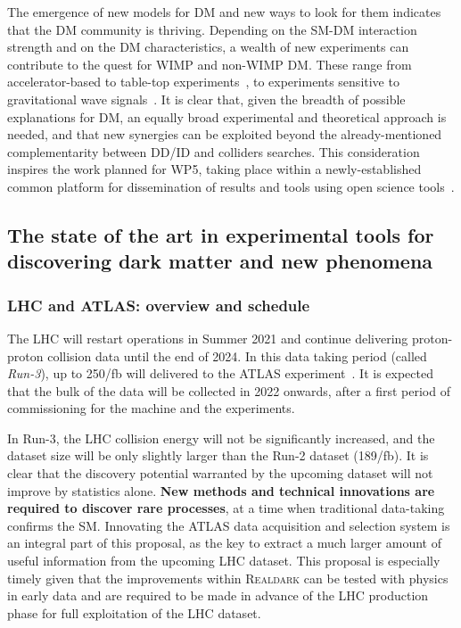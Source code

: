 The emergence of new models for DM and new ways to look for them indicates that the DM community is thriving.  
Depending on the SM-DM interaction strength and on the DM characteristics, a wealth of new experiments can contribute to the quest for WIMP and non-WIMP DM. 
These range from accelerator-based to table-top experiments~\cite{Beacham:2019nyx}, to experiments sensitive to gravitational wave signals~\cite{ToBeCited}.%
It is clear that, given the breadth of possible explanations for DM, an equally broad experimental and theoretical approach is needed, 
and that new synergies can be exploited beyond the already-mentioned complementarity between DD/ID and colliders searches. 
This consideration inspires the work planned for WP5, taking place within a newly-established common platform for dissemination of results and tools using open science tools~\cite{iDMEu}. 

\subsection{The state of the art in experimental tools for discovering dark matter and new phenomena}
\label{sub:stateOfTheArtExperiment}

\subsubsection{LHC and ATLAS: overview and schedule}
\smallskip

The LHC will restart operations in Summer 2021 and continue delivering proton-proton collision data until the end of 2024. In this data taking period (called \textit{Run-3}), up to 250/fb will delivered to the ATLAS experiment~\cite{ToBeCited}.%
It is expected that the bulk of the data will be collected in 2022 onwards, after a first period of commissioning for the machine and the experiments. 

In Run-3, the LHC collision energy will not be significantly increased, and the dataset size will be only slightly larger than the Run-2 dataset (189/fb). 
It is clear that the discovery potential warranted by the upcoming dataset will not improve by statistics alone. 
\textbf{New methods and technical innovations are required to discover rare processes}, at a time when traditional data-taking confirms the SM.%
Innovating the ATLAS data acquisition and selection system is an integral part of this proposal, 
as the key to extract a much larger amount of useful information from the upcoming LHC dataset. 
This proposal is especially timely given that the improvements within \textsc{Realdark} can be tested with physics in early data and are required to be made in advance of the LHC production phase for full exploitation of the LHC dataset. 

